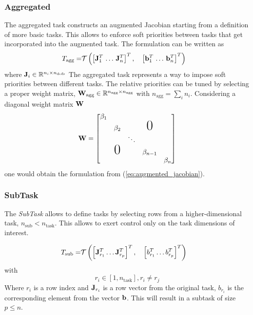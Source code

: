 \subsubsection{Aggregated}
The aggregated task constructs an augmented Jacobian starting from a definition of more basic tasks. This allows to enforce soft priorities between tasks that get incorporated into the augmented task. The formulation can be written as
\begin{eqnarray}
T_\text{agg} = & \mathcal{T} \left( \left[ \mathbf{J}_{1}^T\, \dotsc \,\mathbf{J}_n^T\right]^T, \quad \left[ \mathbf{b}_{1}^T\, \dotsc \,\mathbf{b}_{n}^T\right]^T \right)
\end{eqnarray}
where $\mathbf{J}_i \in \mathbb{R}^{n_i\times n_{\text{dofs}}}$
The aggregated task represents a way to impose soft priorities between different tasks. The relative priorities can be tuned by selecting a proper weight matrix, $\mathbf{W}_\text{agg} \in \mathbb{R}^{n_{\text{agg}}\times n_\text{agg}}$ with $n_\text{agg}=\sum_in_i$.
Considering a diagonal weight matrix $\mathbf{W}$
\begin{equation}
\W=\begin{bmatrix}
\beta_1                                             \\
&       \beta_2           &      & \text{{\huge{0}}}\\
&       &                 \ddots                    \\
&       \text{{\huge{0}}} &      & \beta_{n-1}      \\
&       &                 &      & \beta_n
\end{bmatrix}
\end{equation}
one would obtain the formulation from (\ref{eq:augmented_jacobian}).

\subsubsection{SubTask}
The \emph{SubTask} allows to define tasks by selecting rows from a higher-dimensional task, $n_\text{sub}<n_\text{task}$. This allows to exert control only on the task dimensions of interest.

\begin{eqnarray}
T_\text{sub} = & \mathcal{T} \left( \left[ \mathbf{J}_{r_1}^T \dotsc \mathbf{J}_{r_p}^T \right]^T, \quad \left[ b_{r_1}^T \dotsc b_{r_p}^T \right]^T \right)
\end{eqnarray}
with
\begin{equation*}
r_i \in \left[1, n_\text{task} \right], r_i \neq r_j 
\end{equation*}
Where $r_i$ is a row index and $\mathbf{J}_{r_i}$ is a row vector from the original task, $b_{r_i}$ is the corresponding element from the vector $\mathbf{b}$.
This will result in a subtask of size $p \leq n$.

